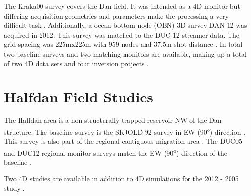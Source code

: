 The Kraka00 survey covers the Dan field. It was intended as a 4D monitor but differing acquisition geometries and parameters make the processing a very difficult task \citep{Dorn-Lopez2005}. Additionally, a ocean bottom node (OBN) 3D survey DAN-12 was acquired in 2012. This survey was matched to the DUC-12 streamer data. The grid spacing was 225mx225m with 959 nodes and 37.5m shot distance \citep{Zaske2014}. In total two baseline surveys and two matching monitors are available, making up a total of two 4D data sets \citep{Zaske2014} and four inversion projects \citep{Micksch2014}.


\section{Halfdan Field Studies}

The Halfdan area is a non-structurally trapped reservoir NW of the Dan structure. The baseline survey is the SKJOLD-92 survey in EW (90\textsuperscript{o}) direction \citep{Calvert2014}. This survey is also part of the regional contiguous migration area \citep{Klinkby2005}. The DUC05 and DUC12 regional monitor surveys match the EW (90\textsuperscript{o}) direction of the baseline \citep{Calvert2014}.

Two 4D studies are available \citep{Calvert2014} in addition to 4D simulations for the 2012 - 2005 study \citep{Calvert2013,Calvert2014}.

